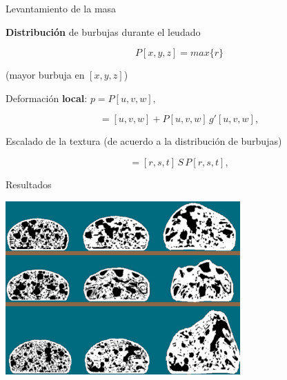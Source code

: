 \documentclass[spanish,unknownkeysallowed]{beamer}
\begin{document}
\begin{frame}{Levantamiento de la masa}

\textbf{Distribución} de burbujas durante el leudado

\begin{equation*}
P[x,y,z] = max \bigg\{r\bigg\}
\end{equation*}

(mayor burbuja en $[x,y,z]$)

\vspace{0.2cm}

Deformación \textbf{local}: $p = P[u,v,w],$

\begin{equation*}
[r,s,t] = [u,v,w] + P[u,v,w] \, g'[u,v,w],
\end{equation*}



Escalado de la textura (de acuerdo a la distribución de burbujas)


\begin{equation*}
[x,y,z] = [r,s,t]\, S \, P[r,s,t],
\end{equation*}

\end{frame}

\begin{frame}{Resultados}

\centerline{\includegraphics[width=9cm]{../figures/Fig9}}

\end{frame}
\end{document}
